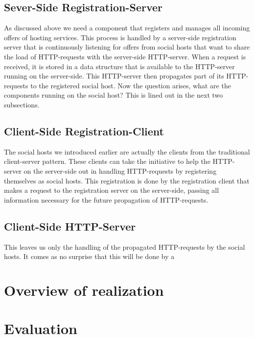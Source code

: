 \documentclass[a4paper, 10pt]{article}
\begin{document}
\subsection{Sever-Side Registration-Server}
As discussed above we need a component that registers and manages all incoming offers of hosting services. This process is handled by a server-side registration server that is continuously listening for offers from social hosts that want to share the load of HTTP-requests with the server-side HTTP-server. When a request is received, it is stored in a data structure that is available to the HTTP-server running on the server-side. This HTTP-server then propagates part of its HTTP-requests to the registered social host. Now the question arises, what are the components running on the social host? This is lined out in the next two subsections.

\subsection{Client-Side Registration-Client}
The social hosts we introduced earlier are actually the clients from the traditional client-server pattern. These clients can take the initiative to help the HTTP-server on the server-side out in handling HTTP-requests by registering themselves as social hosts. This registration is done by the registration client that makes a request to the registration server on the server-side, passing all information necessary for the future propagation of HTTP-requests. 

\subsection{Client-Side HTTP-Server}
This leaves us only the handling of the propagated HTTP-requests by the social hosts. It comes as no surprise that this will be done by a 

\section{Overview of realization}

\section{Evaluation}




\begin{lstlisting}
\end{lstlisting}
\end{document}
